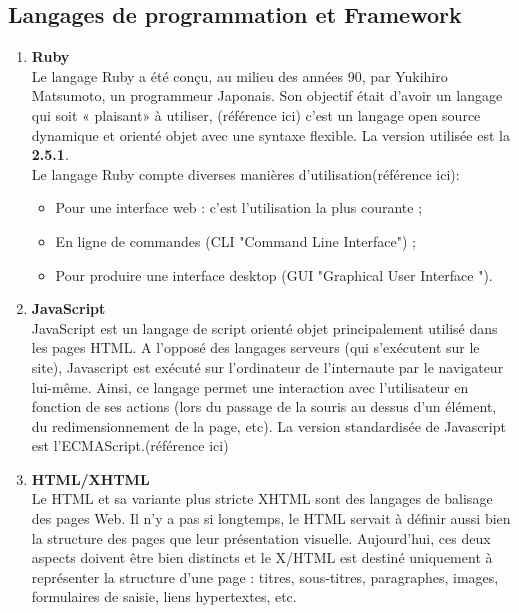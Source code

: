 \documentclass[14pt,A4,french,oneside,leqno]{report}
\begin{document}
	\subsection{Langages de programmation et Framework}
 \begin{enumerate}
 	\item \textbf{Ruby}\\
 	Le langage Ruby a été conçu, au milieu des années 90, par Yukihiro Matsumoto, un
 	programmeur Japonais. Son objectif était d’avoir un langage qui soit « plaisant» à
 	utiliser, (référence ici) c'est un langage open source dynamique et orienté objet avec une syntaxe flexible. La version utilisée est la \textbf{2.5.1}.\\
 	
 \indent	Le langage Ruby compte diverses manières d’utilisation(référence ici):
 	\begin{itemize}
 		\item Pour une interface web : c’est l’utilisation la plus courante ;
 		\item En ligne de commandes (CLI "Command Line Interface") ;
 		\item Pour produire une interface desktop (GUI "Graphical User Interface ").\\
 	\end{itemize}
   	\item \textbf{JavaScript}\\
   	JavaScript est un langage de script orienté objet principalement utilisé dans les pages HTML.
   	A l’opposé des langages serveurs (qui s’exécutent sur le site), Javascript est exécuté sur l’ordinateur de l’internaute par le navigateur lui-même. Ainsi, ce langage permet une interaction
   	avec l’utilisateur en fonction de ses actions (lors du passage de la souris au dessus d’un élément,
   	du redimensionnement de la page, etc). La version standardisée de Javascript est l’ECMAScript.(référence ici)\\
   	\item \textbf{HTML/XHTML}\\
   	 Le HTML et sa variante plus stricte XHTML sont des langages de balisage 
   	des   pages  Web.  Il  n’y  a  pas  si  longtemps,  le  HTML  servait  à  définir  aussi  bien  la 
   	structure des pages que leur présentation visuelle. Aujourd'hui, ces deux aspects doivent 
   	être bien distincts et le X/HTML est destiné uniquement à représenter la structure d’une 
   	page : titres, sous-titres, paragraphes, images, formulaires de saisie, liens hypertextes, 
   	etc.\\
   	

\end{enumerate}
\end{document}
